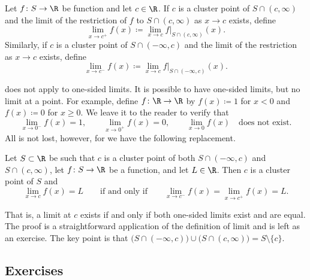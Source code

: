\begin{defn} \label{defn:onesidedlimits}
Let $f \colon S \to \R$ be function and let $c \in \R$.  If
$c$ is a cluster point of
$S \cap (c,\infty)$
and the limit
of the restriction of $f$ to $S \cap (c,\infty)$ 
 as $x \to c$ exists, define
\begin{equation*}
\lim_{x \to c^+} f(x) \coloneqq \lim_{x\to c} f|_{S \cap (c,\infty)}(x) .
\end{equation*}
Similarly, if $c$ is a cluster point of 
$S \cap (-\infty,c)$ and the limit of the restriction as $x \to c$
exists, define
\begin{equation*}
\lim_{x \to c^-} f(x) \coloneqq \lim_{x\to c} f|_{S \cap (-\infty,c)}(x) .
\end{equation*}
\end{defn}

 does not apply to one-sided limits.
It is possible to have one-sided limits, but no limit at a point.  For
example, define $f \colon \R \to \R$ by $f(x) \coloneqq 1$ for $x < 0$ and
$f(x) \coloneqq 0$ for $x \geq 0$.
We leave it to the reader to verify that
\begin{equation*}
\lim_{x \to 0^-} f(x) = 1, \qquad
\lim_{x \to 0^+} f(x) = 0, \qquad
\lim_{x \to 0} f(x) \quad \text{does not exist.}
\end{equation*}
All is not lost, however, for we have the following replacement.

\begin{prop} \label{prop:onesidedlimits}
Let $S \subset \R$ be such that $c$ is a cluster point
of both $S \cap (-\infty,c)$ and $S \cap (c,\infty)$, let
$f \colon S \to \R$ be a function, and let $L \in \R$.  Then $c$ is a cluster point of $S$ and
\begin{equation*}
\lim_{x \to c} f(x) = L
\qquad \text{if and only if} \qquad
\lim_{x \to c^-} f(x) =
\lim_{x \to c^+} f(x) =
L .
\end{equation*}
\end{prop}

That is, a limit at $c$ exists if and only if both one-sided limits exist and are equal.  The
proof is a straightforward application of the definition of limit
and is left as an exercise.  The key point is that
$\bigl( S \cap (-\infty,c) \bigr) \cup \bigl( S \cap (c,\infty) \bigr)
= S \setminus \{ c \}$.

\subsection{Exercises}

